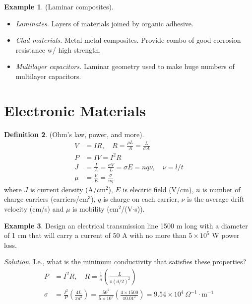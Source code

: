 \documentclass{article}
\theoremstyle{definition}
\newtheorem{definition}{Definition}[section]
\newtheorem{example}[definition]{Example}
\begin{document}
\begin{example}
    (Laminar composites).
    \begin{itemize}
        \item \textit{Laminates.} Layers of materials joined by organic adhesive.
        \item \textit{Clad materials.} Metal-metal composites. Provide combo of good corrosion resistance w/ high strength.
        \item \textit{Multilayer capacitors.} Laminar geometry used to make huge numbers of multilayer capacitors.
    \end{itemize}
\end{example}


\section{Electronic Materials}

\begin{definition}
    (Ohm's law, power, and more).
    \begin{align}
        V &= IR, \quad R = \frac{\rho L}{A} = \frac{L}{\sigma A} \\
        P &= IV = I^2R \\
        J &= \frac{I}{A} = \frac{\sigma V}{L} = \sigma E = nq\nu, \quad \nu = l/t \\
        \mu &= \frac{\nu}{E} = \frac{\sigma}{nq}
    \end{align}
    where $J$ is current density (A/cm$^2$), $E$ is electric field (V/cm), $n$ is number of charge carriers (carriers/cm$^3$), $q$ is charge on each carrier, $\nu$ is the average drift velocity (cm/s) and $\mu$ is mobility (cm$^2$/(V$\cdot$s)).
\end{definition}

\begin{example}
    Design an electrical transmission line 1500 m long with a diameter of 1 cm that will carry a current of 50 A with no more than $5 \times 10^5$ W power loss. \vspace{1em}
    
    \textit{Solution}. I.e., what is the minimum conductivity that satisfies these properties?
    \begin{align*}
        P &= I^2 R, \quad R = \frac{1}{\sigma} \left( \frac{L}{\pi (d/2)^2} \right) \\
        \sigma &= \frac{I^2}{P} \left( \frac{4L}{\pi d^2} \right) = \frac{50^2}{5 \times 10^5} \left( \frac{4 \times 1500}{\pi 0.01^2} \right) = 9.54 \times 10^4\ \Omega^{-1} \cdot \text{m}^{-1}
    \end{align*}
\end{example}
\end{document}
